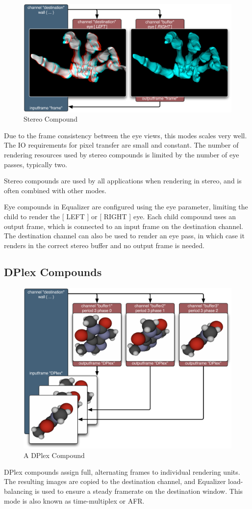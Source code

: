 \documentclass[10pt,a4]{scrartcl}
\begin{document}
\begin{figure}
  \includegraphics[width=.618\textwidth]{images/EYE.pdf}
  {\caption{\label{fStereoCmp}Stereo Compound}}
\end{figure}
Due to the frame consistency between the eye views, this modes scales very
well. The IO requirements for pixel transfer are small and constant. The number
of rendering resources used by stereo compounds is limited by the number of eye
passes, typically two.

Stereo compounds are used by all applications when rendering in stereo,
and is often combined with other modes.

Eye compounds in Equalizer are configured using the \textsf{eye}
parameter, limiting the child to render the \textsf{[ LEFT ]} or
\textsf{[ RIGHT ]} eye. Each child compound uses an output frame, which
is connected to an input frame on the destination channel. The
destination channel can also be used to render an eye pass, in which case
it renders in the correct stereo buffer and no output frame is needed.


\subsection{\label{sDPlex}DPlex Compounds}

\begin{figure}
  \vspace{-2ex}
  \includegraphics[width=.618\textwidth]{images/DPlex.pdf}
  {\caption{A DPlex Compound}}
\end{figure}
DPlex compounds assign full, alternating frames to individual rendering
units. The resulting images are copied to the destination channel, and
Equalizer load-balancing is used to ensure a steady framerate on the
destination window. This mode is also known as time-multiplex or AFR.
\end{document}

